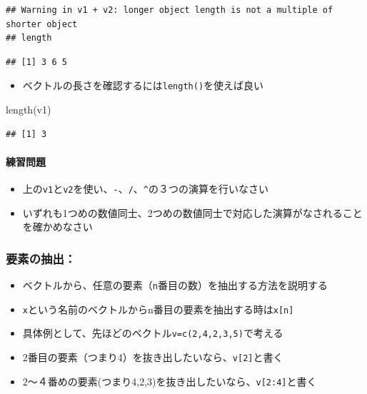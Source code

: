 \documentclass[
]{book}
\newenvironment{Shaded}{\begin{snugshade}}{\end{snugshade}}
\newcommand{\FunctionTok}[1]{\textcolor[rgb]{0.00,0.00,0.00}{#1}}
\newcommand{\NormalTok}[1]{#1}
\providecommand{\tightlist}{%
  \setlength{\itemsep}{0pt}\setlength{\parskip}{0pt}}
\begin{document}
\begin{verbatim}
## Warning in v1 + v2: longer object length is not a multiple of shorter object
## length
\end{verbatim}

\begin{verbatim}
## [1] 3 6 5
\end{verbatim}

\begin{itemize}
\tightlist
\item
  ベクトルの長さを確認するには\texttt{length()}を使えば良い
\end{itemize}

\begin{Shaded}
\begin{Highlighting}[]
\FunctionTok{length}\NormalTok{(v1)}
\end{Highlighting}
\end{Shaded}

\begin{verbatim}
## [1] 3
\end{verbatim}

\hypertarget{ux7df4ux7fd2ux554fux984c-3}{%
\paragraph*{練習問題}\label{ux7df4ux7fd2ux554fux984c-3}}

\begin{itemize}
\tightlist
\item
  上の\texttt{v1}と\texttt{v2}を使い、\texttt{-}、\texttt{/}、\texttt{\^{}}の３つの演算を行いなさい\\
\item
  いずれも1つめの数値同士、2つめの数値同士で対応した演算がなされることを確かめなさい
\end{itemize}

\hypertarget{ux8981ux7d20ux306eux62bdux51fa}{%
\subsubsection*{要素の抽出：}\label{ux8981ux7d20ux306eux62bdux51fa}}

\begin{itemize}
\item
  ベクトルから、任意の要素（\texttt{n}番目の数）を抽出する方法を説明する
\item
  \texttt{x}という名前のベクトルからn番目の要素を抽出する時は\texttt{x{[}n{]}}
\item
  具体例として、先ほどのベクトル\texttt{v=c(2,4,2,3,5)}で考える
\item
  2番目の要素（つまり4）を抜き出したいなら、\texttt{v{[}2{]}}と書く
\item
  2〜４番めの要素(つまり4,2,3)を抜き出したいなら、\texttt{v{[}2:4{]}}と書く
\end{itemize}
\end{document}
